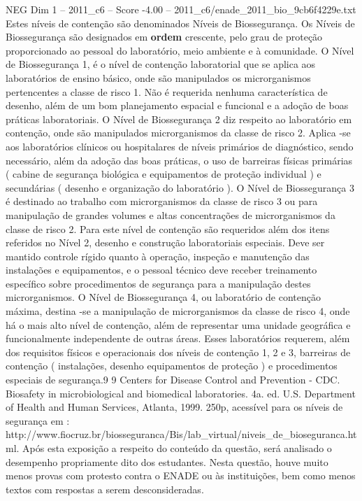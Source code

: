 \begin{textsample}{NEG Dim 1 – 2011\_c6 – Score -4.00 – 2011\_c6/enade\_2011\_bio\_9cb6f4229e.txt}
Estes níveis de contenção são denominados Níveis de Biossegurança.
Os Níveis de Biossegurança são designados em \textbf{ordem} crescente, pelo grau de proteção proporcionado ao pessoal do laboratório, meio ambiente e à comunidade.
O Nível de Biossegurança 1, é o nível de contenção laboratorial que se aplica aos laboratórios de ensino básico, onde são manipulados os microrganismos pertencentes a classe de risco 1.
Não é requerida nenhuma característica de desenho, além de um bom planejamento espacial e funcional e a adoção de boas práticas laboratoriais.
O Nível de Biossegurança 2 diz respeito ao laboratório em contenção, onde são manipulados microrganismos da classe de risco 2.
Aplica -se aos laboratórios clínicos ou hospitalares de níveis primários de diagnóstico, sendo necessário, além da adoção das boas práticas, o uso de barreiras físicas primárias ( cabine de segurança biológica e equipamentos de proteção individual ) e secundárias ( desenho e organização do laboratório ).
O Nível de Biossegurança 3 é destinado ao trabalho com microrganismos da classe de risco 3 ou para manipulação de grandes volumes e altas concentrações de microrganismos da classe de risco 2.
Para este nível de contenção são requeridos além dos itens referidos no Nível 2, desenho e construção laboratoriais especiais.
Deve ser mantido controle rígido quanto à operação, inspeção e manutenção das instalações e equipamentos, e o pessoal técnico deve receber treinamento específico sobre procedimentos de segurança para a manipulação destes microrganismos.
O Nível de Biossegurança 4, ou laboratório de contenção máxima, destina -se a manipulação de microrganismos da classe de risco 4, onde há o mais alto nível de contenção, além de representar uma unidade geográfica e funcionalmente independente de outras áreas.
Esses laboratórios requerem, além dos requisitos físicos e operacionais dos níveis de contenção 1, 2 e 3, barreiras de contenção ( instalações, desenho equipamentos de proteção ) e procedimentos especiais de segurança.9 9 Centers for Disease Control and Prevention - CDC.
Biosafety in microbiological and biomedical laboratories. 4a. ed.
U.S.
Department of Health and Human Services, Atlanta, 1999. 250p, acessível para os níveis de segurança em : http://www.fiocruz.br/biosseguranca/Bis/lab\_virtual/niveis\_de\_bioseguranca.html.
Após esta exposição a respeito do conteúdo da questão, será analisado o desempenho propriamente dito dos estudantes.
Nesta questão, houve muito menos provas com protesto contra o ENADE ou às instituições, bem como menos textos com respostas a serem desconsideradas.

\end{textsample}

